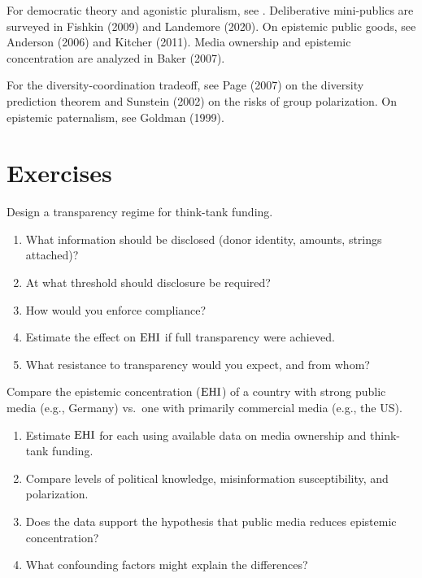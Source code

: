For democratic theory and agonistic pluralism, see \textcite{mouffe2005}.
Deliberative mini-publics are surveyed in Fishkin (2009) and Landemore (2020).
On epistemic public goods, see Anderson (2006) and Kitcher (2011).
Media ownership and epistemic concentration are analyzed in Baker (2007).

For the diversity-coordination tradeoff, see Page (2007) on the diversity prediction theorem and Sunstein (2002) on the risks of group polarization.
On epistemic paternalism, see Goldman (1999).

\section{Exercises}

\begin{exercise}
Design a transparency regime for think-tank funding.
\begin{enumerate}[nosep]
  \item What information should be disclosed (donor identity, amounts, strings attached)?
  \item At what threshold should disclosure be required?
  \item How would you enforce compliance?
  \item Estimate the effect on $\mathrm{EHI}$ if full transparency were achieved.
  \item What resistance to transparency would you expect, and from whom?
\end{enumerate}
\end{exercise}

\begin{exercise}
Compare the epistemic concentration ($\mathrm{EHI}$) of a country with strong public media (e.g., Germany) vs.\ one with primarily commercial media (e.g., the US).
\begin{enumerate}[nosep]
  \item Estimate $\mathrm{EHI}$ for each using available data on media ownership and think-tank funding.
  \item Compare levels of political knowledge, misinformation susceptibility, and polarization.
  \item Does the data support the hypothesis that public media reduces epistemic concentration?
  \item What confounding factors might explain the differences?
\end{enumerate}
\end{exercise}

